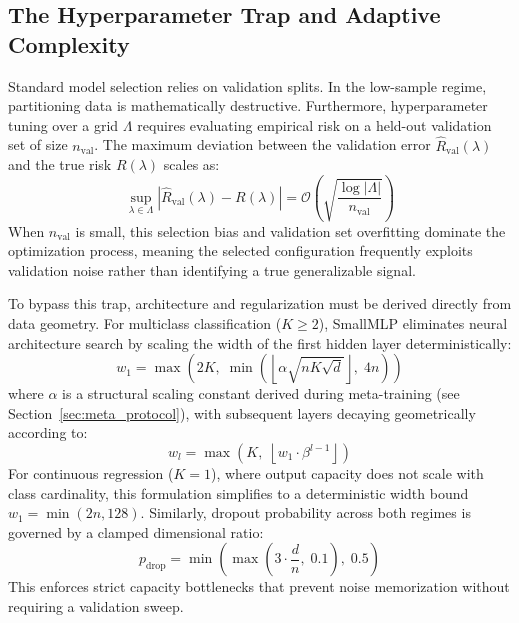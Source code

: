 \documentclass{article}
\begin{document}
\subsection{The Hyperparameter Trap and Adaptive Complexity}
Standard model selection relies on validation splits. In the low-sample regime, partitioning data is mathematically destructive. Furthermore, hyperparameter tuning over a grid $\Lambda$ requires evaluating empirical risk on a held-out validation set of size $n_{\text{val}}$. The maximum deviation between the validation error $\hat{R}_{\text{val}}(\lambda)$ and the true risk $R(\lambda)$ scales as:
\begin{equation}
\label{eq:val_bound}
\sup_{\lambda \in \Lambda} \left|\hat{R}_{\text{val}}(\lambda) - R(\lambda)\right| = \mathcal{O}\left( \sqrt{\frac{\log |\Lambda|}{n_{\text{val}}}} \right)
\end{equation}
When $n_{\text{val}}$ is small, this selection bias and validation set overfitting dominate the optimization process, meaning the selected configuration frequently exploits validation noise rather than identifying a true generalizable signal.

To bypass this trap, architecture and regularization must be derived directly from data geometry. For multiclass classification ($K \ge 2$), SmallMLP eliminates neural architecture search by scaling the width of the first hidden layer deterministically:
\begin{equation}
\label{eq:width_w1}
w_1 = \max\left(2K, \; \min\left(\left\lfloor \alpha \sqrt{n K \sqrt{d}} \right\rfloor, \; 4n\right)\right)
\end{equation}
where $\alpha$ is a structural scaling constant derived during meta-training (see Section~\ref{sec:meta_protocol}), with subsequent layers decaying geometrically according to:
\begin{equation}
\label{eq:width_wl}
w_l = \max\left(K, \; \left\lfloor w_1 \cdot \beta^{l-1} \right\rfloor\right)
\end{equation}
For continuous regression ($K=1$), where output capacity does not scale with class cardinality, this formulation simplifies to a deterministic width bound $w_1 = \min(2n, 128)$. Similarly, dropout probability across both regimes is governed by a clamped dimensional ratio:
\begin{equation}
\label{eq:dropout}
p_{\text{drop}} = \min\left(\max\left(3 \cdot \frac{d}{n}, \; 0.1\right), \; 0.5\right)
\end{equation}
This enforces strict capacity bottlenecks that prevent noise memorization without requiring a validation sweep.
\end{document}
